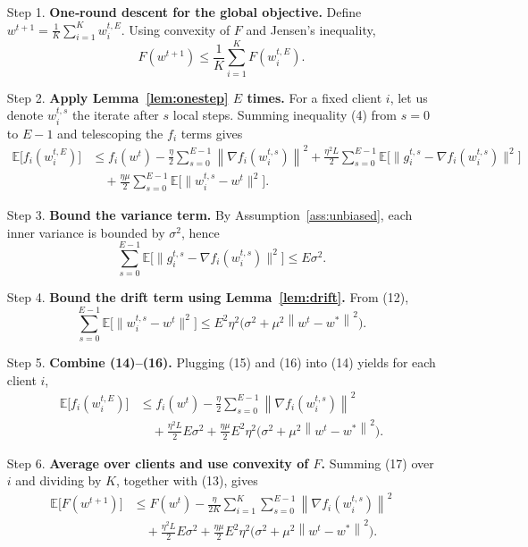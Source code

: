 \documentclass{article}
\newcommand{\E}{\mathbb{E}}
\newcommand{\norm}[1]{\left\lVert#1\right\rVert}
\begin{document}
\begin{enumerate}
\item[Step 1.] \textbf{One‑round descent for the global objective.}  
Define $w^{t+1}= \frac{1}{K}\sum_{i=1}^{K} w_{i}^{t,E}$.
Using convexity of $F$ and Jensen’s inequality,
\[
F(w^{t+1})\le \frac{1}{K}\sum_{i=1}^{K}F(w_{i}^{t,E}).
\tag{13}
\]

\item[Step 2.] \textbf{Apply Lemma~\ref{lem:onestep} $E$ times.}  
For a fixed client $i$, let us denote $w_{i}^{t,s}$ the iterate after $s$ local steps.
Summing inequality (4) from $s=0$ to $E-1$ and telescoping the $f_i$ terms gives
\[
\begin{aligned}
\E\!\bigl[f_i(w_{i}^{t,E})\bigr]
&\le f_i(w^{t})
-\frac{\eta}{2}\sum_{s=0}^{E-1}\norm{\nabla f_i(w_{i}^{t,s})}^{2}
+\frac{\eta^{2}L}{2}\sum_{s=0}^{E-1}\E\!\bigl[\|g_{i}^{t,s}-\nabla f_i(w_{i}^{t,s})\|^{2}\bigr]\\
&\quad+\frac{\eta\mu}{2}\sum_{s=0}^{E-1}\E\!\bigl[\|w_{i}^{t,s}-w^{t}\|^{2}\bigr].
\end{aligned}
\tag{14}
\]

\item[Step 3.] \textbf{Bound the variance term.}  
By Assumption~\ref{ass:unbiased}, each inner variance is bounded by $\sigma^{2}$,
hence
\[
\sum_{s=0}^{E-1}\E\!\bigl[\|g_{i}^{t,s}-\nabla f_i(w_{i}^{t,s})\|^{2}\bigr]\le E\sigma^{2}.
\tag{15}
\]

\item[Step 4.] \textbf{Bound the drift term using Lemma~\ref{lem:drift}.}  
From (12),
\[
\sum_{s=0}^{E-1}\E\!\bigl[\|w_{i}^{t,s}-w^{t}\|^{2}\bigr]
\le E^{2}\eta^{2}\bigl(\sigma^{2}+ \mu^{2}\norm{w^{t}-w^{*}}^{2}\bigr).
\tag{16}
\]

\item[Step 5.] \textbf{Combine (14)–(16).}  
Plugging (15) and (16) into (14) yields for each client $i$,
\[
\begin{aligned}
\E\!\bigl[f_i(w_{i}^{t,E})\bigr]
&\le f_i(w^{t})
-\frac{\eta}{2}\sum_{s=0}^{E-1}\norm{\nabla f_i(w_{i}^{t,s})}^{2}\\
&\quad+\frac{\eta^{2}L}{2}E\sigma^{2}
+\frac{\eta\mu}{2}E^{2}\eta^{2}\bigl(\sigma^{2}+ \mu^{2}\norm{w^{t}-w^{*}}^{2}\bigr).
\end{aligned}
\tag{17}
\]

\item[Step 6.] \textbf{Average over clients and use convexity of $F$.}  
Summing (17) over $i$ and dividing by $K$, together with (13), gives
\[
\begin{aligned}
\E\!\bigl[F(w^{t+1})\bigr]
&\le F(w^{t})
-\frac{\eta}{2K}\sum_{i=1}^{K}\sum_{s=0}^{E-1}\norm{\nabla f_i(w_{i}^{t,s})}^{2}\\
&\quad+\frac{\eta^{2}L}{2}E\sigma^{2}
+\frac{\eta\mu}{2}E^{2}\eta^{2}\bigl(\sigma^{2}+ \mu^{2}\norm{w^{t}-w^{*}}^{2}\bigr).
\end{aligned}
\tag{18}
\]


\end{enumerate}
\end{document}
